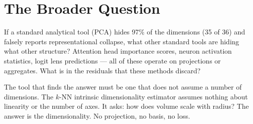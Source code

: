 \documentclass[11pt]{article}
\begin{document}
\section{The Broader Question}

If a standard analytical tool (PCA) hides 97\% of the dimensions (35 of 36) and falsely reports representational collapse, what other standard tools are hiding what other structure? Attention head importance scores, neuron activation statistics, logit lens predictions --- all of these operate on projections or aggregates. What is in the residuals that these methods discard?

The tool that finds the answer must be one that does not assume a number of dimensions. The $k$-NN intrinsic dimensionality estimator assumes nothing about linearity or the number of axes. It asks: how does volume scale with radius? The answer is the dimensionality. No projection, no basis, no loss.
\end{document}
